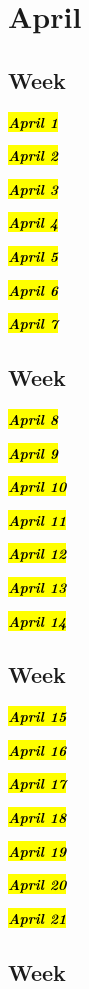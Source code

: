 \chapter{April}
\section{Week }

\hl{\textbf{\textit{April 1}}}

\hl{\textbf{\textit{April 2}}}

\hl{\textbf{\textit{April 3}}}

\hl{\textbf{\textit{April 4}}}

\hl{\textbf{\textit{April 5}}}

\hl{\textbf{\textit{April 6}}}

\hl{\textbf{\textit{April 7}}}

\section{Week }

\hl{\textbf{\textit{April 8}}}

\hl{\textbf{\textit{April 9}}}

\hl{\textbf{\textit{April 10}}}

\hl{\textbf{\textit{April 11}}}

\hl{\textbf{\textit{April 12}}}

\hl{\textbf{\textit{April 13}}}

\hl{\textbf{\textit{April 14}}}

\section{Week }

\hl{\textbf{\textit{April 15}}}

\hl{\textbf{\textit{April 16}}}

\hl{\textbf{\textit{April 17}}}

\hl{\textbf{\textit{April 18}}}

\hl{\textbf{\textit{April 19}}}

\hl{\textbf{\textit{April 20}}}

\hl{\textbf{\textit{April 21}}}

\section{Week }

